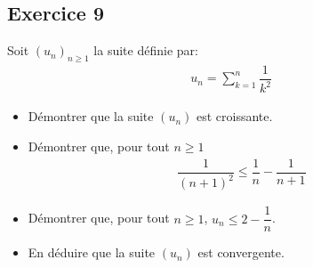 \documentclass[letterpaper,10pt,french]{jupyterBook}
\begin{document}
\subsection{Exercice 9}
\label{\detokenize{exo2:exercice-9}}
\sphinxAtStartPar
Soit \((u_n)_{n\geq 1}\) la suite définie par:
\begin{equation*}
\begin{split}
u_n = \sum_{k=1}^{n} \dfrac{1}{k^2}
\end{split}
\end{equation*}\begin{itemize}
\item {} 
\sphinxAtStartPar
Démontrer que la suite \((u_n)\) est croissante.

\item {} 
\sphinxAtStartPar
Démontrer que, pour tout \(n \geq 1\)
\begin{equation*}
\begin{split}
    \dfrac{1}{(n+1)^2} \leq \dfrac{1}{n} - \dfrac{1}{n+1}
    \end{split}
\end{equation*}
\item {} 
\sphinxAtStartPar
Démontrer que, pour tout \(n \geq 1\), \(u_n \leq 2−\dfrac{1}{n}\).

\item {} 
\sphinxAtStartPar
En déduire que la suite \((u_n)\) est convergente.

\end{itemize}
\end{document}
